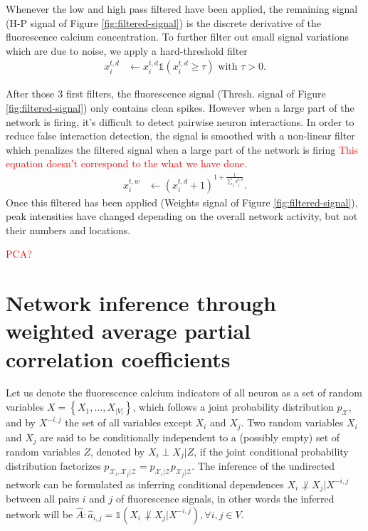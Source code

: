 \documentclass[wcp]{jmlr}
\begin{document}
Whenever the low and high pass filtered have been applied, the remaining signal
(H-P signal of Figure \ref{fig:filtered-signal}) is the discrete
derivative of the fluorescence calcium concentration. To further filter out
small signal variations which are due to noise, we apply a hard-threshold
filter
\begin{align}
x^{t,d}_i &\leftarrow x^{t,d}_i \mathbb{1}(x^{t,d}_i \geq \tau) \text{ with } \tau > 0.
\end{align}

After those 3 first filters, the fluorescence signal (Thresh. signal of
Figure \ref{fig:filtered-signal}) only contains clean spikes. However when a large
part of the network is firing, it's difficult to detect pairwise neuron
interactions. In order to reduce false interaction detection,
the signal is smoothed with a non-linear filter which penalizes
the filtered signal when a large part of the network is firing
\textcolor{red}{This equation doesn't correspond to the what we have done.}
\begin{align}
 x^{t,w}_i  &\leftarrow (x^{t,d}_i + 1 )^{1 + \frac{1}{\sum_{j} x^{t,d}_j}}.
\end{align}
Once this filtered has been applied (Weights signal of
Figure \ref{fig:filtered-signal}), peak intensities have
changed depending on the overall network activity, but not their numbers and
locations.

\textcolor{red}{PCA?}


\section{Network inference through weighted average partial correlation
            coefficients}
\label{sec:inference}

Let us denote the fluorescence calcium indicators of all neuron
as a set of random variables $X = \left\{X_1, \ldots, X_{|V|}\right\}$, which follows
a joint probability distribution $p_\mathcal{X}$, and by
$X^{-i,j}$ the set of all variables except $X_i$ and $X_j$.
Two random variables $X_i$ and $X_j$ are said to be conditionally independent
to a (possibly empty) set of random variables $Z$, denoted by $X_i \perp X_j | Z$,
if the joint conditional probability distribution factorizes
$p_{\mathcal{X}_i, \mathcal{X}_j|\mathcal{Z}} = p_{\mathcal{X}_i|\mathcal{Z}}
p_{\mathcal{X}_j|\mathcal{Z}}$.  The inference of the undirected network
can be formulated as inferring conditional dependences
$X_i \not\perp X_j | X^{-i,j}$ between all pairs $i$ and $j$ of fluorescence
signals, in other words the inferred network will be
$\hat{A}: \hat{a}_{i,j} = \mathbb{1}(X_i \not\perp X_j | X^{-i,j}), \forall i, j \in V$.
\end{document}
